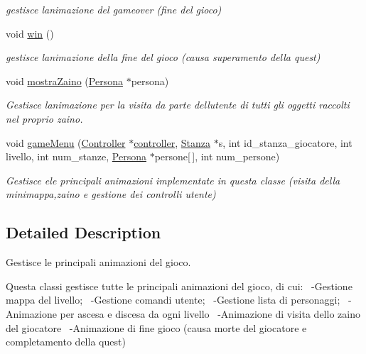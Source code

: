 \begin{DoxyCompactItemize}
\begin{DoxyCompactList}\small\item\em gestisce l\textquotesingle{}animazione del gameover (fine del gioco) \end{DoxyCompactList}\item 
\hypertarget{classAnimazioni_a625f92a5cefa6fbda9199a2a2be71015}{}void \hyperlink{classAnimazioni_a625f92a5cefa6fbda9199a2a2be71015}{win} ()\label{classAnimazioni_a625f92a5cefa6fbda9199a2a2be71015}

\begin{DoxyCompactList}\small\item\em gestisce l\textquotesingle{}animazione della fine del gioco (causa superamento della quest) \end{DoxyCompactList}\item 
void \hyperlink{classAnimazioni_ab96f159fbf43b336508b8ef35e1485f8}{mostra\+Zaino} (\hyperlink{classPersona}{Persona} $\ast$persona)
\begin{DoxyCompactList}\small\item\em Gestisce l\textquotesingle{}animazione per la visita da parte dell\textquotesingle{}utente di tutti gli oggetti raccolti nel proprio zaino. \end{DoxyCompactList}\item 
void \hyperlink{classAnimazioni_a33d8edbeb81631a2dfccfa985238d5ca}{game\+Menu} (\hyperlink{structController}{Controller} $\ast$\hyperlink{structcontroller}{controller}, \hyperlink{classStanza}{Stanza} $\ast$s, int id\+\_\+stanza\+\_\+giocatore, int livello, int num\+\_\+stanze, \hyperlink{classPersona}{Persona} $\ast$persone\mbox{[}$\,$\mbox{]}, int num\+\_\+persone)
\begin{DoxyCompactList}\small\item\em Gestisce ele principali animazioni implementate in questa classe (visita della minimappa,zaino e gestione dei controlli utente) \end{DoxyCompactList}\end{DoxyCompactItemize}


\subsection{Detailed Description}
Gestisce le principali animazioni del gioco. 

Questa classi gestisce tutte le principali animazioni del gioco, di cui\+:~\newline
 -\/\+Gestione mappa del livello;~\newline
 -\/\+Gestione comandi utente;~\newline
 -\/\+Gestione lista di personaggi;~\newline
 -\/\+Animazione per ascesa e discesa da ogni livello~\newline
 -\/\+Animazione di visita dello zaino del giocatore~\newline
 -\/\+Animazione di fine gioco (causa morte del giocatore e completamento della quest) 

